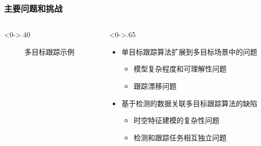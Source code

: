 \begin{frame}
	\frametitle{主要问题和挑战}
	\begin{columns}[T] %
		\begin{column}<0->{.40\textwidth}
			\begin{figure}[thpb]
				\centering
				\caption{多目标跟踪示例}
			\end{figure}
		\end{column}
		\hfill%
		\begin{column}<0->{.65\textwidth}
			\begin{itemize}
				\item<1-> 单目标跟踪算法扩展到多目标场景中的问题
				\begin{itemize}
					\item<1-> 模型复杂程度和可理解性问题
					\item<1-> 跟踪漂移问题
				\end{itemize}
				\item<1-> 基于检测的数据关联多目标跟踪算法的缺陷
				\begin{itemize}
					\item<1-> 时空特征建模的复杂性问题
					\item<1-> 检测和跟踪任务相互独立问题
				\end{itemize}
			\end{itemize}
		\end{column}%
	\end{columns}
\end{frame}


